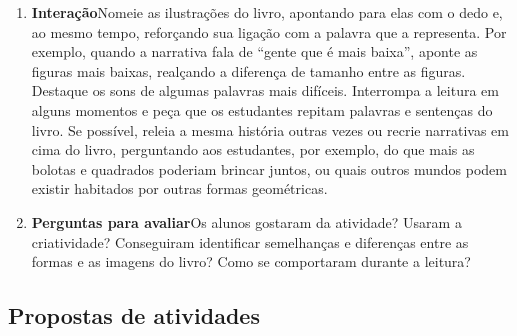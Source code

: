 \documentclass[11pt]{extarticle}
\begin{document}
\begin{enumerate}
\item \textbf{Interação}\quad Nomeie as ilustrações 
do livro, apontando para elas com o dedo e, ao mesmo tempo, reforçando sua ligação com a palavra que a representa. Por exemplo, quando a narrativa fala de ``gente que é mais baixa'', aponte as figuras mais baixas, realçando a diferença de tamanho entre as figuras.
Destaque os sons de algumas 
palavras mais difíceis. Interrompa a leitura em alguns momentos e peça que 
os estudantes repitam palavras e sentenças do livro. Se possível, 
releia a mesma história outras vezes ou recrie narrativas em cima do livro, perguntando aos estudantes, por exemplo, do que mais as bolotas e quadrados poderiam brincar juntos, ou quais outros mundos podem existir habitados por outras formas geométricas.

\item \textbf{Perguntas para avaliar}\quad Os alunos gostaram da atividade? Usaram a criatividade? Conseguiram identificar semelhanças e diferenças entre as formas e as imagens do livro?  Como se comportaram durante a leitura? 
\end{enumerate}


\subsection{Propostas de atividades}

\end{document}
